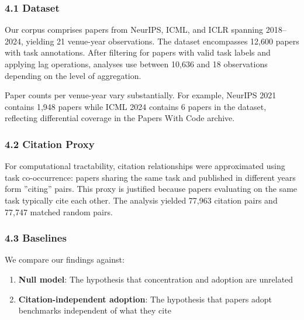 
\subsubsection{4.1 Dataset}

Our corpus comprises papers from NeurIPS, ICML, and ICLR spanning 2018--2024, yielding 21 venue-year observations. The dataset encompasses 12,600 papers with task annotations. After filtering for papers with valid task labels and applying lag operations, analyses use between 10,636 and 18 observations depending on the level of aggregation.

Paper counts per venue-year vary substantially. For example, NeurIPS 2021 contains 1,948 papers while ICML 2024 contains 6 papers in the dataset, reflecting differential coverage in the Papers With Code archive.

\subsubsection{4.2 Citation Proxy}

For computational tractability, citation relationships were approximated using task co-occurrence: papers sharing the same task and published in different years form ''citing'' pairs. This proxy is justified because papers evaluating on the same task typically cite each other. The analysis yielded 77,963 citation pairs and 77,747 matched random pairs.

\subsubsection{4.3 Baselines}

We compare our findings against:

\begin{enumerate}
\item \textbf{Null model}: The hypothesis that concentration and adoption are unrelated
\item \textbf{Citation-independent adoption}: The hypothesis that papers adopt benchmarks independent of what they cite
\end{enumerate}


